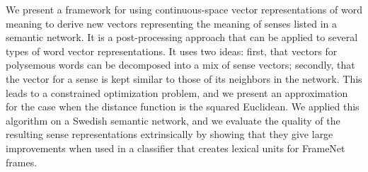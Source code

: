 We present a framework for using continuous-space vector representations of word meaning to derive new vectors representing the meaning of senses listed in a semantic network. It is a post-processing approach that can be applied to several types of word vector representations. It uses two ideas: first, that vectors for polysemous words can be decomposed into a mix of sense vectors; secondly, that the vector for a sense is kept similar to those of its neighbors in the network. This leads to a constrained optimization problem, and we present an approximation for the case when the distance function is the squared Euclidean. We applied this algorithm on a Swedish semantic network, and we evaluate the quality of the resulting sense representations extrinsically by showing that they give large improvements when used in a classifier that creates lexical units for FrameNet frames.
